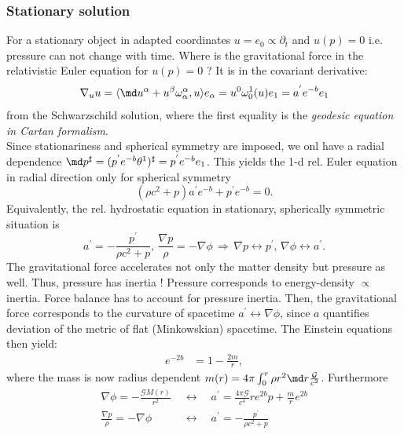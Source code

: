 \subsubsection{Stationary solution}
	For a stationary object in adapted coordinates $u=e_0 \propto \partial_t$ and $u(p)=0$ i.e. pressure can not change with time. Where is the gravitational force in the relativistic Euler equation for $u(p)=0$ ? It is in the covariant derivative: 
	\begin{equation}
	\nabla_u u= \langle \md u^{\alpha} + u^{\beta} \omega^{\alpha}_{\alpha}, u \rangle e_{\alpha} = u^0 \omega^1_0(u) e_1 = a^{'} e^{-b} e_1
	\end{equation}
	from the Schwarzschild solution, where the first equality is the \emph{geodesic equation in Cartan formalism}.\\
	Since stationariness and spherical symmetry are imposed, we onl have a radial dependence $\md p^{\sharp} = (p^{'} e^{-b} \theta^1)^{\sharp} = p^{'} e^{-b} e_1$. This yields the 1-d rel. Euler equation in radial direction only for spherical symmetry
	\begin{equation}
		(\rho c^2+p) a^{'} e^{-b} + p^{'} e^{-b} =0.
	\end{equation}
	Equivalently, the rel. hydrostatic equation in stationary, spherically symmetric situation is
	\begin{equation}
		a^{'}= - \frac{p^{'} }{\rho c^2+p}, \, \frac{\nabla p}{\rho} = - \nabla \phi \, \Rightarrow \, \nabla p \leftrightarrow p^{'} , \, \nabla \phi \leftrightarrow a^{'}.
	\end{equation}
The gravitational force accelerates not only the matter density but pressure as well. Thus, pressure has inertia ! Pressure corresponds to energy-density $\propto$ inertia. Force balance has to account for pressure inertia. Then, the gravitational force corresponds to the curvature of spacetime $a^{'}  \leftrightarrow \nabla \phi$, since $a$ quantifies deviation of the metric of flat (Minkowskian) spacetime. The Einstein equations then yield:
	\begin{align}
		e^{-2b} & = 1-\frac{2m}{r},
	\end{align}
where the mass is now radius dependent $m(r)=4 \pi \int_0^r \rho r^2 \md r \frac{\mathcal{G}}{c^2}$.
Furthermore
\begin{align}
\nabla \phi = - \frac{\mathcal{G} M(r)}{r^2} \;&\leftrightarrow \quad a^{'} = \frac{4 \pi \mathcal{G}}{c^4} r e^{2b} p + \frac{m}{r} e^{2b} \\
\frac{\nabla p}{\rho}= - \nabla \phi \; &\leftrightarrow \quad    a^{'}= -\frac{p^{'}}{\rho c^2+p}
\end{align}
